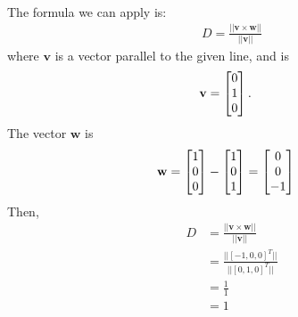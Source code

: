 \item
{}\\
The formula we can apply is:
\begin{align*}
  D = \frac{||\mathbf{v} \times \mathbf{w}||}{|| \mathbf{v}||}
\end{align*}
where $\mathbf{v}$ is a vector parallel to the given line, and is
\begin{align*}
  \mathbf{v} &= \begin{bmatrix} 0 \\ 1 \\ 0 \end{bmatrix}.
\end{align*}
The vector $\mathbf{w}$ is
\begin{align*}
  \mathbf{w} &= \begin{bmatrix} 1 \\ 0 \\ 0 \end{bmatrix}  - \begin{bmatrix} 1 \\ 0 \\ 1 \end{bmatrix} = \begin{bmatrix} 0\\0\\-1 \end{bmatrix}
\end{align*}
Then,
\begin{align*}
  D & = \frac{||\mathbf{v} \times \mathbf{w}||}{|| \mathbf{v}||} \\
  &= \frac{||[ -1,0,0 ] ^T||}{|| [0,1,0]^T||}\\
  &= \frac{1}{1}\\
  &= 1
\end{align*}
